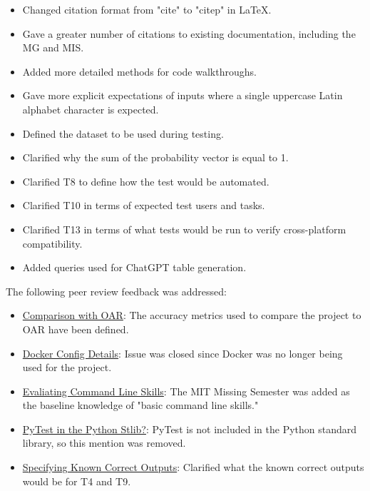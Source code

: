 \documentclass{article}
\begin{document}
\begin{itemize}
  \item Changed citation format from "cite" to "citep" in LaTeX.
  \item Gave a greater number of citations to existing documentation, including the MG and MIS.
  \item Added more detailed methods for code walkthroughs.
  \item Gave more explicit expectations of inputs where a single uppercase Latin alphabet character is expected.
  \item Defined the dataset to be used during testing.
  \item Clarified why the sum of the probability vector is equal to 1.
  \item Clarified T8 to define how the test would be automated.
  \item Clarified T10 in terms of expected test users and tasks.
  \item Clarified T13 in terms of what tests would be run to verify cross-platform compatibility.
  \item Added queries used for ChatGPT table generation.
\end{itemize}

\noindent The following peer review feedback was addressed:

\begin{itemize}
  \item \href{https://github.com/ptrandev/OCRacle/issues/16}{Comparison with OAR}:
  The accuracy metrics used to compare the \progname{} project to OAR have been defined.
  \item \href{https://github.com/ptrandev/OCRacle/issues/15}{Docker Config Details}:
  Issue was closed since Docker was no longer being used for the project.
  \item \href{https://github.com/ptrandev/OCRacle/issues/14}{Evaliating Command Line Skills}:
  The MIT Missing Semester was added as the baseline knowledge of "basic command line skills."
  \item \href{https://github.com/ptrandev/OCRacle/issues/13}{PyTest in the Python Stlib?}:
  PyTest is not included in the Python standard library, so this mention was removed.
  \item \href{https://github.com/ptrandev/OCRacle/issues/12}{Specifying Known Correct Outputs}:
  Clarified what the known correct outputs would be for T4 and T9.
\end{itemize}
\end{document}
